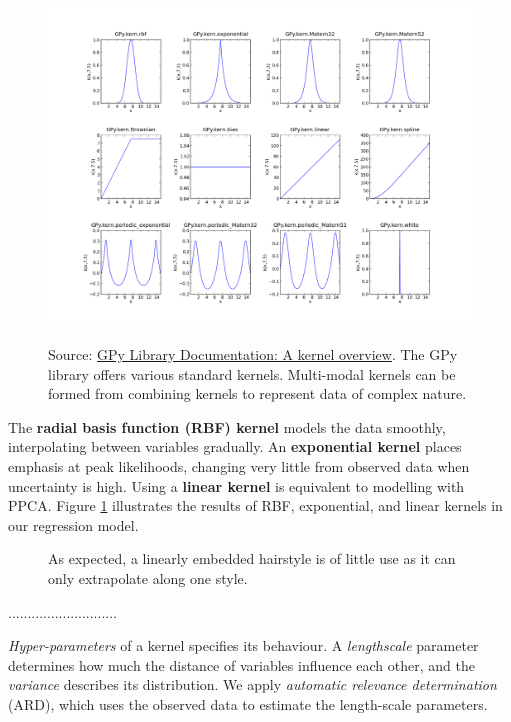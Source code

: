 \documentclass[ %
author={Dillon Keith Diep},
supervisor={Dr. Carl Henrik Ek},
degree={MEng},
title={ART-CG:},
subtitle={Assisted Real-time Content Generation of 3D Hair by Learning Manifolds},
type={Research},
year={2017} ]{dissertation}
\begin{document}
\begin{figure}[!h]
	\centering
	\includegraphics[scale=0.3]{images/gpyKernels}\\
	\caption{Source: \href{http://gpytest2.readthedocs.io/en/latest/tuto_kernel_overview.html}{GPy Library Documentation: A kernel overview}. The GPy library offers various standard kernels. Multi-modal kernels can be formed from combining kernels to represent data of complex nature.}
\end{figure}

The \textbf{radial basis function (RBF) kernel} models the data smoothly, interpolating between variables gradually. An \textbf{exponential kernel} places emphasis at peak likelihoods, changing very little from observed data when uncertainty is high. Using a \textbf{linear kernel} is equivalent to modelling with PPCA. Figure \ref{kernelHair} illustrates the results of RBF, exponential, and linear kernels in our regression model.

{\color{red}
\begin{figure}[!h]
	\centering
	\caption{As expected, a linearly embedded hairstyle is of little use as it can only extrapolate along one style. }
	\label{kernelHair}
\end{figure}
............................
}

\textit{Hyper-parameters} of a kernel specifies its behaviour. A \textit{lengthscale} parameter determines how much the distance of variables influence each other, and the \textit{variance} describes its distribution. We apply \textit{automatic relevance determination} (ARD), which uses the observed data to estimate the length-scale parameters. 
\end{document}

